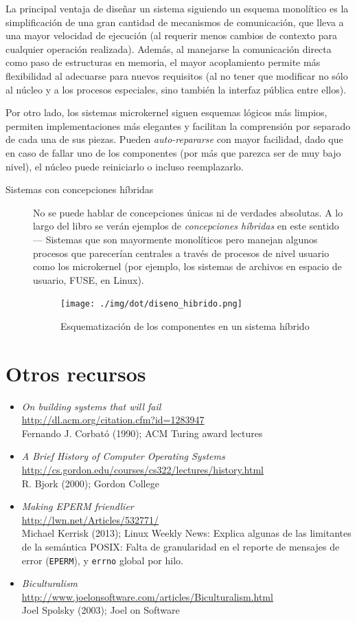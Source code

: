 \documentclass[11pt,fleqn]{book} %
\newcommand{\otrorec}[1]{ \\ {\small \url{#1}} \\ }
\begin{document}
La principal ventaja de diseñar un sistema siguiendo un esquema
monolítico es la simplificación de una gran cantidad de mecanismos de
comunicación, que lleva a una mayor velocidad de ejecución (al
requerir menos cambios de contexto para cualquier operación
realizada). Además, al manejarse la comunicación directa como paso de
estructuras en memoria, el mayor acoplamiento permite más flexibilidad
al adecuarse para nuevos requisitos (al no tener que modificar no sólo
al núcleo y a los procesos especiales, sino también la interfaz
pública entre ellos).

Por otro lado, los sistemas microkernel siguen esquemas lógicos más
limpios, permiten implementaciones más elegantes y facilitan la
comprensión por separado de cada una de sus piezas. Pueden
\emph{auto-repararse} con mayor facilidad, dado que en caso de fallar uno
de los componentes (por más que parezca ser de muy bajo nivel), el
núcleo puede reiniciarlo o incluso reemplazarlo.

\begin{description}
\item[Sistemas con concepciones híbridas] No se puede  hablar de
     concepciones únicas ni de verdades absolutas. A lo largo del
     libro se verán ejemplos de \emph{concepciones híbridas} en este sentido
     — Sistemas que son mayormente monolíticos pero manejan algunos
     procesos que parecerían centrales a través de procesos de nivel
     usuario como los microkernel (por ejemplo, los sistemas de
     archivos en espacio de usuario, FUSE, en Linux).

     \begin{figure}[htb]
     \centering
     \texttt{[image: ./img/dot/diseno\_hibrido.png]}
     \caption{\label{INTRO_diseno_hibrido}Esquematización de los componentes en un sistema híbrido}
     \end{figure}
\end{description}
\section{Otros recursos}
\label{sec-1-6}


\begin{itemize}
\item \emph{On building systems that will fail}
  \otrorec{http://dl.acm.org/citation.cfm?id=1283947}
  Fernando J. Corbató
  (1990); ACM Turing award lectures
\item \emph{A Brief History of Computer Operating Systems}
  \otrorec{http://cs.gordon.edu/courses/cs322/lectures/history.html}
  R. Bjork (2000); Gordon College
\item \emph{Making EPERM friendlier}
  \otrorec{http://lwn.net/Articles/532771/}
  Michael Kerrisk (2013); Linux Weekly News: Explica algunas de las
  limitantes de la semántica POSIX: Falta de granularidad en el
  reporte de mensajes de error (\texttt{EPERM}), y \texttt{errno} global por hilo.
\item \emph{Biculturalism}
  \otrorec{http://www.joelonsoftware.com/articles/Biculturalism.html}
  Joel Spolsky (2003); Joel on Software
\end{itemize}
\end{document}
